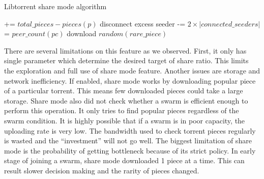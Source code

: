 \begin{algorithm}[h!]
	\caption{Libtorrent share mode algorithm}
	\label{alg:ltsharemode}
	\begin{algorithmic}[1]
		\Statex
		 += {$total\_pieces - pieces(p)$} \label{alg:l_lts:missingp}
		\EndIf	
		\EndFor
		\State disconnect excess seeder \label{alg:l_lts:disconnectpeers}
		\EndIf
		 -= {$2 \times |connected\_seeders|$}	\label{alg:l_lts:reducemissing}	
		\State \Return
		\EndIf
		 \label{alg:l_lts:retdlenough}
		\State \Return
		\EndIf
		 \label{alg:l_lts:retdling}
		\State \Return
		\EndIf
			\label{alg:l_lts:rarepc}
		 = {$peer\_count(pc)$} 
		\EndIf	
		\EndFor
		 \label{alg:l_lts:rareunable}
		\State \Return
		\EndIf
		\State download {$random(rare\_piece)$} \label{alg:l_lts:dlrare}
	\end{algorithmic}
\end{algorithm}

There are several limitations on this feature as we observed. First, it only has single parameter which determine the desired target of share ratio. This limits the exploration and full use of share mode feature. Another issues are storage and network inefficiency. If enabled, share mode works by downloading popular piece of a particular torrent. This means few downloaded pieces could take a large storage. Share mode also did not check whether a swarm is efficient enough to perform this operation. It only tries to find popular pieces regardless of the swarm condition. It is highly possible that if a swarm is in poor capacity, the uploading rate is very low. The bandwidth used to check torrent pieces regularly is wasted and the ``investment'' will not go well. The biggest limitation of share mode is the probability of getting bottleneck because of its strict policy. In early stage of joining a swarm, share mode downloaded 1 piece at a time. This can result slower decision making and the rarity of pieces changed. 

